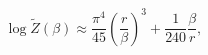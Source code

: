 \begin{equation}
\log \widetilde{Z}\left(\beta \right)\approx \frac{\pi ^{4}}{45}\left(\frac{r}{\beta }\right)^{3}+\frac{1}{240}\frac{\beta }{r},\end{equation}

